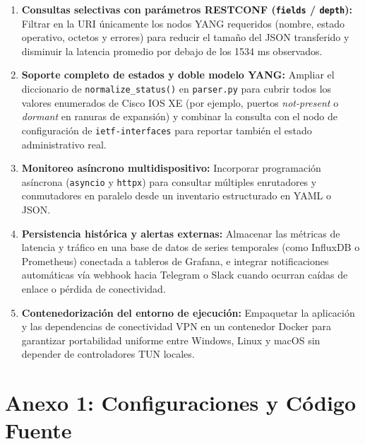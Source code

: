 \documentclass[12pt,a4paper]{article}
\begin{document}
\begin{enumerate}
    \item \textbf{Consultas selectivas con parámetros RESTCONF (\texttt{fields} / \texttt{depth}):} Filtrar en la URI únicamente los nodos YANG requeridos (nombre, estado operativo, octetos y errores) para reducir el tamaño del JSON transferido y disminuir la latencia promedio por debajo de los 1534 ms observados.
    \item \textbf{Soporte completo de estados y doble modelo YANG:} Ampliar el diccionario de \texttt{normalize\_status()} en \texttt{parser.py} para cubrir todos los valores enumerados de Cisco IOS XE (por ejemplo, puertos \textit{not-present} o \textit{dormant} en ranuras de expansión) y combinar la consulta con el nodo de configuración de \texttt{ietf-interfaces} para reportar también el estado administrativo real.
    \item \textbf{Monitoreo asíncrono multidispositivo:} Incorporar programación asíncrona (\texttt{asyncio} y \texttt{httpx}) para consultar múltiples enrutadores y conmutadores en paralelo desde un inventario estructurado en YAML o JSON.
    \item \textbf{Persistencia histórica y alertas externas:} Almacenar las métricas de latencia y tráfico en una base de datos de series temporales (como InfluxDB o Prometheus) conectada a tableros de Grafana, e integrar notificaciones automáticas vía webhook hacia Telegram o Slack cuando ocurran caídas de enlace o pérdida de conectividad.
    \item \textbf{Contenedorización del entorno de ejecución:} Empaquetar la aplicación y las dependencias de conectividad VPN en un contenedor Docker para garantizar portabilidad uniforme entre Windows, Linux y macOS sin depender de controladores TUN locales.
\end{enumerate}


\newpage

\printbibliography[
    heading=bibnumbered,
    title={Referencias Bibliográficas}
]


\newpage
\section{Anexo 1: Configuraciones y Código Fuente}
\end{document}

